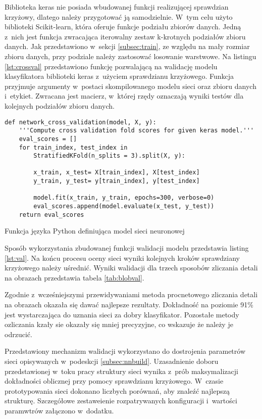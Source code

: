 Biblioteka keras nie posiada wbudowanej funkcji realizującej sprawdzian
krzyżowy, dlatego należy przygotować ją samodzielnie.
W~tym celu użyto biblioteki Scikit-learn, która oferuje funkcje podziału
zbiorów danych.
Jedną z~nich jest funkcja zwracająca iterowalny zestaw k-krotnych
podziałów zbioru danych.
Jak przedstawiono w~sekcji \ref{subsec:train}, ze względu na mały rozmiar
zbioru danych, przy podziale należy zastosować losowanie warstwowe.
Na listingu \ref{lst:crossval} przedstawiono funkcję pozwalającą na walidację
modelu klasyfikatora biblioteki keras z~użyciem sprawdzianu krzyżowego.
Funkcja przyjmuje argumenty w~postaci skompilowanego modelu sieci oraz
zbioru danych i~etykiet.
Zwracana jest macierz, w~której rzędy oznaczają wyniki testów dla kolejnych
podziałów zbioru danych.
\begin{listing}[htbp]
\begin{verbatim}
def network_cross_validation(model, X, y):
    '''Compute cross validation fold scores for given keras model.'''
    eval_scores = []
    for train_index, test_index in 
        StratifiedKFold(n_splits = 3).split(X, y):
        
        x_train, x_test= X[train_index], X[test_index]
        y_train, y_test= y[train_index], y[test_index]
        
        model.fit(x_train, y_train, epochs=300, verbose=0)
        eval_scores.append(model.evaluate(x_test, y_test))
    return eval_scores
\end{verbatim}
\caption{Funkcja języka Python definiująca model sieci neuronowej}
\label{lst:crossval}
\end{listing}
Sposób wykorzystania zbudowanej funkcji walidacji modelu przedstawia
listing \ref{lst:val}.
Na końcu procesu oceny sieci wyniki kolejnych kroków sprawdziany krzyżowego
należy uśrednić.
Wyniki walidacji dla trzech sposobów zliczania detali na obrazach przedstawia
tabela \ref{tab:blobval}.

Zgodnie z~wcześniejszymi przewidywaniami metoda procnetowego zliczania
detali na obrazach okazała się dawać najlepsze rezultaty.
Dokładność na poziomie 91\% jest wystarczająca do uznania sieci za
dobry klasyfikator.
Pozostałe metody ozliczania kzały sie okazały się mniej precyzyjne, co
wskazuje że należy je odrzucić.

Przedstawiony mechanizm walidacji wykorzystano do dostrojenia parametrów
sieci opisywanych w~podeskcji \ref{subsec:nnbuild}.
Uzasadnienie doboru przedstawionej w~toku pracy struktury sieci wynika z~prób
maksymalizacji dokładności oblicznej przy pomocy sprawdzianu krzyżowego.
W~czasie prototypowania sieci dokonano liczbych porównań, aby znaleźć
najlepszą strukturę.
Szczegółowe zestaweienie rozpatrywanych konfiguracji i~wartości paramwtrów
załączono w~dodatku.


